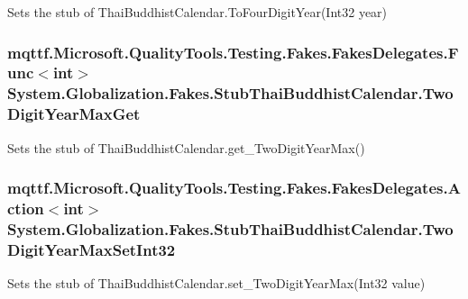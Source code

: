 Sets the stub of Thai\-Buddhist\-Calendar.\-To\-Four\-Digit\-Year(\-Int32 year)

\hypertarget{class_system_1_1_globalization_1_1_fakes_1_1_stub_thai_buddhist_calendar_abcc222ee253c7386e9d46de21afd37c3}{
\subsubsection[{Two\-Digit\-Year\-Max\-Get}]{\setlength{\rightskip}{0pt plus 5cm}mqttf.\-Microsoft.\-Quality\-Tools.\-Testing.\-Fakes.\-Fakes\-Delegates.\-Func$<$int$>$ System.\-Globalization.\-Fakes.\-Stub\-Thai\-Buddhist\-Calendar.\-Two\-Digit\-Year\-Max\-Get}}\label{class_system_1_1_globalization_1_1_fakes_1_1_stub_thai_buddhist_calendar_abcc222ee253c7386e9d46de21afd37c3}


Sets the stub of Thai\-Buddhist\-Calendar.\-get\-\_\-\-Two\-Digit\-Year\-Max()

\hypertarget{class_system_1_1_globalization_1_1_fakes_1_1_stub_thai_buddhist_calendar_ab631a4137f96b98bcd638422f81eec21}{
\subsubsection[{Two\-Digit\-Year\-Max\-Set\-Int32}]{\setlength{\rightskip}{0pt plus 5cm}mqttf.\-Microsoft.\-Quality\-Tools.\-Testing.\-Fakes.\-Fakes\-Delegates.\-Action$<$int$>$ System.\-Globalization.\-Fakes.\-Stub\-Thai\-Buddhist\-Calendar.\-Two\-Digit\-Year\-Max\-Set\-Int32}}\label{class_system_1_1_globalization_1_1_fakes_1_1_stub_thai_buddhist_calendar_ab631a4137f96b98bcd638422f81eec21}


Sets the stub of Thai\-Buddhist\-Calendar.\-set\-\_\-\-Two\-Digit\-Year\-Max(\-Int32 value)



